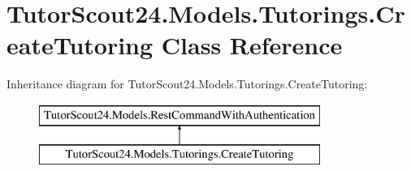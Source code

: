 \hypertarget{class_tutor_scout24_1_1_models_1_1_tutorings_1_1_create_tutoring}{}\section{Tutor\+Scout24.\+Models.\+Tutorings.\+Create\+Tutoring Class Reference}
\label{class_tutor_scout24_1_1_models_1_1_tutorings_1_1_create_tutoring}
Inheritance diagram for Tutor\+Scout24.\+Models.\+Tutorings.\+Create\+Tutoring\+:\begin{figure}[H]
\begin{center}
\leavevmode
\includegraphics[height=2.000000cm]{class_tutor_scout24_1_1_models_1_1_tutorings_1_1_create_tutoring}
\end{center}
\end{figure}
